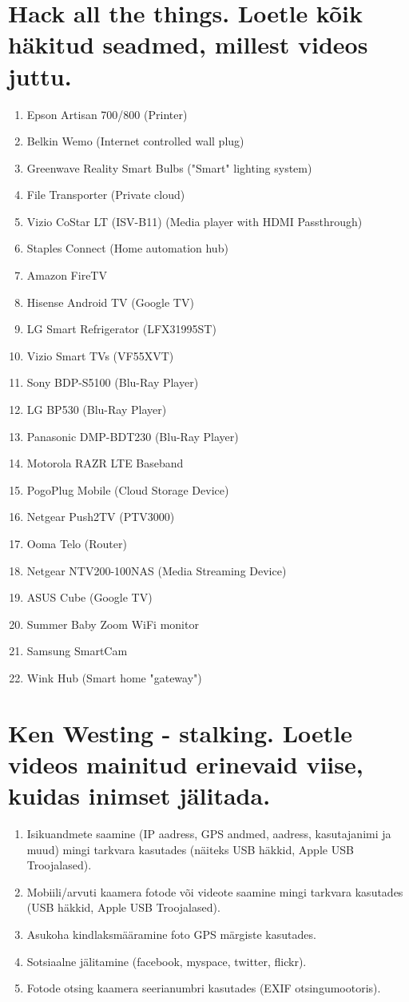 \documentclass{article}
\begin{document}
\section{Hack all the things. Loetle kõik häkitud seadmed, millest videos juttu.}
\begin{enumerate}
	\item{Epson Artisan 700/800 (Printer)}
	\item{Belkin Wemo (Internet controlled wall plug)}
	\item{Greenwave Reality Smart Bulbs ("Smart" lighting system)}
	\item{File Transporter (Private cloud)}
	\item{Vizio CoStar LT (ISV-B11) (Media player with HDMI Passthrough)}
	\item{Staples Connect (Home automation hub)}
	\item{Amazon FireTV}
	\item{Hisense Android TV (Google TV)}
	\item{LG Smart Refrigerator (LFX31995ST)}
	\item{Vizio Smart TVs (VF55XVT)}
	\item{Sony BDP-S5100 (Blu-Ray Player)}
	\item{LG BP530 (Blu-Ray Player)}
	\item{Panasonic DMP-BDT230 (Blu-Ray Player)}
	\item{Motorola RAZR LTE Baseband}
	\item{PogoPlug Mobile (Cloud Storage Device)}
	\item{Netgear Push2TV (PTV3000)}
	\item{Ooma Telo (Router)}
	\item{Netgear NTV200-100NAS (Media Streaming Device)}
	\item{ASUS Cube (Google TV)}
	\item{Summer Baby Zoom WiFi monitor}
	\item{Samsung SmartCam}
	\item{Wink Hub (Smart home "gateway")}
\end{enumerate}

\section{Ken Westing - stalking. Loetle videos mainitud erinevaid viise, kuidas inimset jälitada.}
\begin{enumerate}
	\item{Isikuandmete saamine (IP aadress,  GPS andmed, aadress, kasutajanimi ja muud) mingi tarkvara kasutades (näiteks USB häkkid, Apple USB Troojalased).}
	\item{Mobiili/arvuti kaamera fotode või videote saamine mingi tarkvara kasutades (USB häkkid, Apple USB Troojalased).}
	\item{Asukoha kindlaksmääramine foto GPS märgiste kasutades.}
	\item{Sotsiaalne jälitamine (facebook, myspace, twitter, flickr).}
	\item{Fotode otsing kaamera seerianumbri kasutades (EXIF otsingumootoris).}
\end{enumerate}
\end{document}
